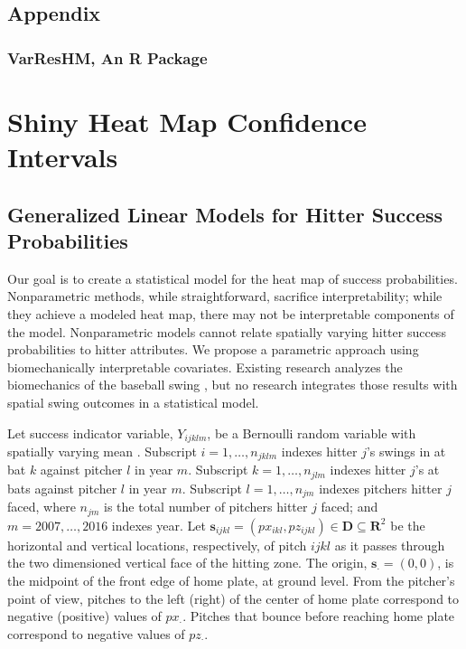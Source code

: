 \documentclass{article}
\begin{document}
\subsection{Appendix}
\subsubsection{VarResHM, An R Package}

\section{Shiny Heat Map Confidence Intervals}

\subsection{Generalized Linear Models for Hitter Success Probabilities} 

Our goal is to create a statistical model for the heat map of success probabilities. Nonparametric methods, while straightforward, sacrifice interpretability; while they achieve a modeled heat map, there may not be interpretable components of the model. Nonparametric models cannot relate spatially varying hitter success probabilities to hitter attributes. We propose a parametric approach using biomechanically interpretable covariates. Existing research analyzes the biomechanics of the baseball swing \citep{Welch1995}, but no research integrates those results with spatial swing outcomes in a statistical model.


Let success indicator variable, $Y_{ijklm}$, be a Bernoulli random variable with spatially varying mean \citep{Ross2002}. Subscript $i = 1, \dots, n_{jklm}$ indexes hitter $j$'s swings in at bat $k$ against pitcher $l$ in year $m$. Subscript $k = 1, \dots, n_{jlm}$ indexes hitter $j$'s at bats against pitcher $l$ in year $m$. Subscript $l = 1, \dots, n_{jm}$ indexes pitchers hitter $j$ faced, where $n_{jm}$ is the total number of pitchers hitter $j$ faced; and $m = 2007, \dots, 2016$ indexes year. Let $\pmb{s}_{ijkl} = (px_{ikl}, pz_{ijkl})\in \pmb{D} \subseteq \pmb{R}^{2}$ be the horizontal and vertical locations, respectively, of pitch $ijkl$ as it passes through the two dimensioned vertical face of the hitting zone. The origin, $\pmb{s}_{\cdot} = (0,0)$, is the midpoint of the front edge of home plate, at ground level. From the pitcher's point of view, pitches to the left (right) of the center of home plate correspond to negative (positive) values of $px_{\cdot}$. Pitches that bounce before reaching home plate correspond to negative values of $pz_{\cdot}$.  
\end{document}
